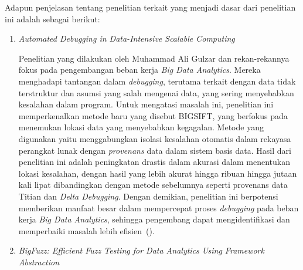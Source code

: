 Adapun penjelasan tentang penelitian terkait yang menjadi 
dasar dari penelitian ini adalah sebagai berikut:
\begin{enumerate}
\item \emph{Automated Debugging in Data-Intensive Scalable Computing}

Penelitian yang dilakukan oleh Muhammad Ali Gulzar dan rekan-rekannya fokus pada pengembangan beban kerja \emph{Big Data Analytics}. Mereka menghadapi tantangan dalam \emph{debugging}, terutama terkait dengan data tidak terstruktur dan asumsi yang salah mengenai data, yang sering menyebabkan kesalahan dalam program. Untuk mengatasi masalah ini, penelitian ini memperkenalkan metode baru yang disebut BIGSIFT, yang berfokus pada menemukan lokasi data yang menyebabkan kegagalan. Metode yang digunakan yaitu menggabungkan isolasi kesalahan otomatis dalam rekayasa perangkat lunak dengan \emph{provenans} data dalam sistem basis data. Hasil dari penelitian ini adalah peningkatan drastis dalam akurasi dalam menentukan lokasi kesalahan, dengan hasil yang lebih akurat hingga ribuan hingga jutaan kali lipat dibandingkan dengan metode sebelumnya seperti provenans data Titian dan \emph{Delta Debugging}. Dengan demikian, penelitian ini berpotensi memberikan manfaat besar dalam mempercepat proses \emph{debugging} pada beban kerja \emph{Big Data Analytics}, sehingga pengembang dapat mengidentifikasi dan memperbaiki masalah lebih efisien~(\cite{gulzar2017}).

\item \emph{BigFuzz: Efficient Fuzz Testing for Data Analytics Using Framework Abstraction}


\end{enumerate}
